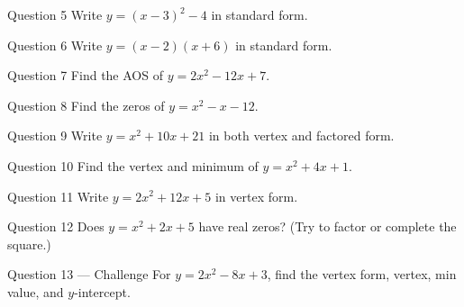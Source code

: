 \documentclass[11pt]{article}
\begin{document}
\begin{qbox}{Question 5}
Write $y=(x-3)^2-4$ in standard form.\workspace{2.0cm}
\end{qbox}

\begin{qbox}{Question 6}
Write $y=(x-2)(x+6)$ in standard form.\workspace{2.0cm}
\end{qbox}

\begin{qbox}{Question 7}
Find the AOS of $y=2x^2-12x+7$.\workspace{2.0cm}
\end{qbox}

\begin{qbox}{Question 8}
Find the zeros of $y=x^2-x-12$.\workspace{2.0cm}
\end{qbox}

\begin{qbox}{Question 9}
Write $y=x^2+10x+21$ in both vertex and factored form.\workspace{2.6cm}
\end{qbox}

\begin{qbox}{Question 10}
Find the vertex and minimum of $y=x^2+4x+1$.\workspace{2.4cm}
\end{qbox}

\begin{qbox}{Question 11}
Write $y=2x^2+12x+5$ in vertex form.\workspace{2.4cm}
\end{qbox}

\begin{qbox}{Question 12}
Does $y=x^2+2x+5$ have real zeros? (Try to factor or complete the square.)\workspace{2.4cm}
\end{qbox}

\begin{qbox}{Question 13 --- Challenge}
For $y=2x^2-8x+3$, find the vertex form, vertex, min value, and $y$-intercept.\workspace{3.2cm}
\end{qbox}

\clearpage
{}
\end{document}
